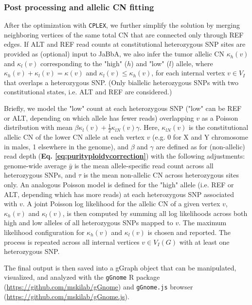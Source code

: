 \documentclass[phd,tocprelim]{cornell}
\begin{document}
\subsubsection*{Post processing and allelic CN fitting}
After the optimization with \texttt{CPLEX}, we further simplify the solution by merging neighboring vertices of the same total CN that are connected only through REF edges. If ALT and REF read counts at constitutional heterozygous SNP sites are provided as (optional) input to JaBbA, we also infer the tumor allelic CN $\kappa_{h}(v)$ and  $\kappa_{l}(v)$ corresponding to the "high" ($h$) and "low" ($l$) allele, where  $\kappa_{h}(v) + \kappa_{l}(v) = \kappa(v)$ and $\kappa_{l}(v) \le \kappa_{h}(v)$, for each internal vertex $v \in V_I$ that overlaps a heterozygous SNP.  (Only biallelic heterozygous SNPs with two constitutional states, i.e. ALT and REF are considered.)  

Briefly, we model the "low" count at each heterozygous SNP ("low" can be REF or ALT, depending on which allele has fewer reads) overlapping $v$ as a Poisson distribution with mean $\beta\kappa_l(v) + \frac{1}{2}\kappa_{lN}(v)\gamma$.  Here, $\kappa_{lN}(v)$ is the constitutional allelic CN of the lower CN allele at each vertex $v$ (e.g. 0 for X and Y chromosome in males, 1 elsewhere in the genome), and $\beta$ and $\gamma$ are defined as for (non-allelic) read depth (\textbf{Eq. \ref{eq:purityploidycorrection}}) with the following adjustments: genome-wide average $\bar{y}$ is the mean allele-specific read count across all heterozygous SNPs, and $\tau$ is the mean non-allelic CN across heterozygous sites only. An analogous Poisson model is defined for the "high" allele (i.e. REF or ALT, depending which has more reads) at each heterozygous SNP associated with $v$.  A joint Poisson log likelihood for the allelic CN of a given vertex $v$, $\kappa_{h}(v)$ and $\kappa_{l}(v)$, is then computed by summing all log likelihoods across both high and low alleles of all heterozygous SNPs mapped to $v$. The maximum likelihood configuration for $\kappa_{h}(v)$ and $\kappa_{l}(v)$ is chosen and reported.  The process is repeated across all internal vertices $v \in V_I(G)$ with at least one heterozygous SNP.

The final output is then saved into a gGraph object that can be manipulated, visualized, and analyzed with the \texttt{gGnome} R package (\url{https://github.com/mskilab/gGnome}) and \texttt{gGnome.js} browser (\url{https://github.com/mskilab/gGnome.js}).  

\end{document}
